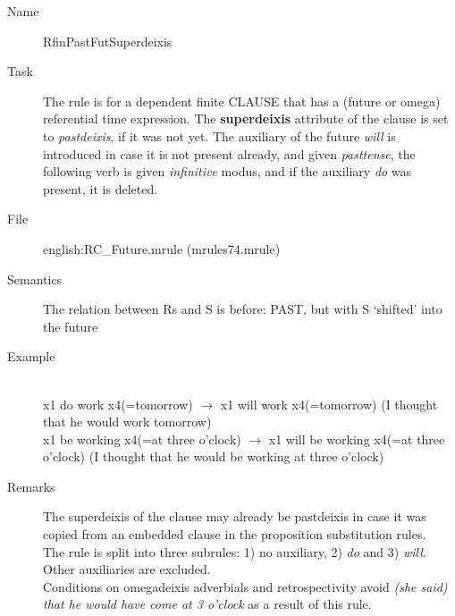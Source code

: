 \begin{description}
\vspace{1 cm}
\begin{description}
\item[Name] RfinPastFutSuperdeixis
\item[Task] The rule is for a dependent finite CLAUSE that has a
(future or omega) referential time expression. 
The {\bf superdeixis} attribute of the clause is set to {\em pastdeixis\/}, 
if it was not yet.
The auxiliary of the future {\em will\/} is introduced in case it is not 
present already, and given {\em 
pasttense\/}, the following verb is given {\em infinitive\/} modus, 
and if the auxiliary {\em do\/} was present, it is deleted. 
\item[File] english:RC\_Future.mrule (mrules74.mrule)
\item[Semantics] The relation between Rs and S is before: PAST, but 
with S `shifted' into the future
\item[Example] \mbox{}\\
x1 do work x4(=tomorrow) $\rightarrow$ x1 will work x4(=tomorrow) (I thought
that he would work tomorrow)\\
x1 be working x4(=at three o'clock) $\rightarrow$ x1 will be working x4(=at 
three o'clock) (I thought that he would be working at three o'clock)
\item[Remarks] 
The superdeixis of the clause may already be  pastdeixis in 
case it was copied from an embedded clause in the proposition substitution 
rules. \\
The rule is split into three subrules: 1) no auxiliary, 2) {\em do} and 3) {\em 
will}. Other auxiliaries are excluded.\\
Conditions on omegadeixis adverbials and retrospectivity avoid {\em (she said) 
that he would have come at 3 o'clock} as a result of this rule.
\end{description}


\end{description}
